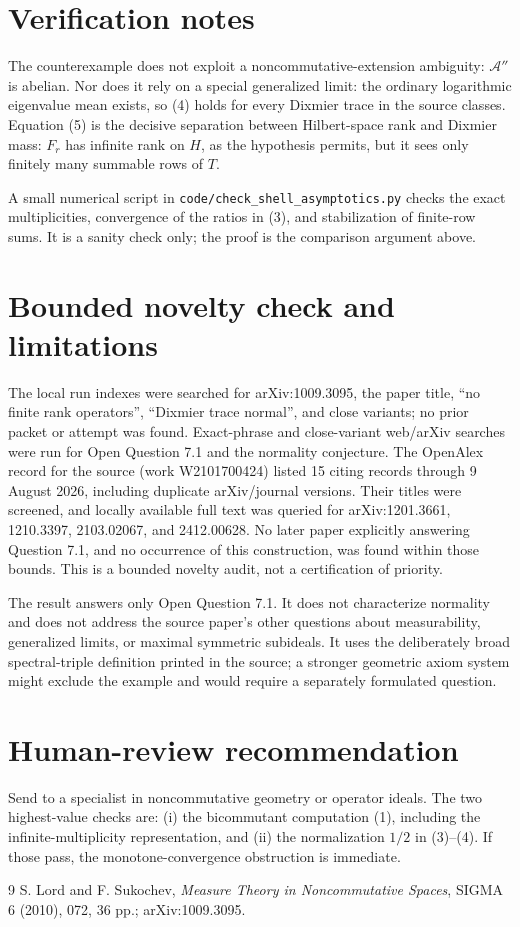 \documentclass[11pt]{article}
\newcommand{\A}{\mathcal A}
\begin{document}
\section{Verification notes}

The counterexample does not exploit a noncommutative-extension ambiguity:
$\A''$ is abelian.  Nor does it rely on a special generalized limit: the
ordinary logarithmic eigenvalue mean exists, so (4) holds for every Dixmier
trace in the source classes.  Equation (5) is the decisive separation between
Hilbert-space rank and Dixmier mass: $F_r$ has infinite rank on $H$, as the
hypothesis permits, but it sees only finitely many summable rows of $T$.

A small numerical script in \texttt{code/check\_shell\_asymptotics.py}
checks the exact multiplicities, convergence of the ratios in (3), and
stabilization of finite-row sums.  It is a sanity check only; the proof is the
comparison argument above.

\section{Bounded novelty check and limitations}

The local run indexes were searched for arXiv:1009.3095, the paper title,
``no finite rank operators'', ``Dixmier trace normal'', and close variants;
no prior packet or attempt was found.  Exact-phrase and close-variant
web/arXiv searches were run for Open Question 7.1 and the normality
conjecture.  The OpenAlex record for the source (work W2101700424) listed 15
citing records through 9 August 2026, including duplicate arXiv/journal
versions.  Their titles were screened, and locally available full text was
queried for arXiv:1201.3661, 1210.3397, 2103.02067, and 2412.00628.  No later
paper explicitly answering Question 7.1, and no occurrence of this
construction, was found within those bounds.  This is a bounded novelty
audit, not a certification of priority.

The result answers only Open Question 7.1.  It does not characterize
normality and does not address the source paper's other questions about
measurability, generalized limits, or maximal symmetric subideals.  It uses
the deliberately broad spectral-triple definition printed in the source; a
stronger geometric axiom system might exclude the example and would require
a separately formulated question.

\section{Human-review recommendation}

Send to a specialist in noncommutative geometry or operator ideals.  The two
highest-value checks are: (i) the bicommutant computation (1), including the
infinite-multiplicity representation, and (ii) the normalization $1/2$ in
(3)--(4).  If those pass, the monotone-convergence obstruction is immediate.

\begin{thebibliography}{9}
S. Lord and F. Sukochev,
\emph{Measure Theory in Noncommutative Spaces},
SIGMA 6 (2010), 072, 36 pp.; arXiv:1009.3095.
\end{thebibliography}
\end{document}
